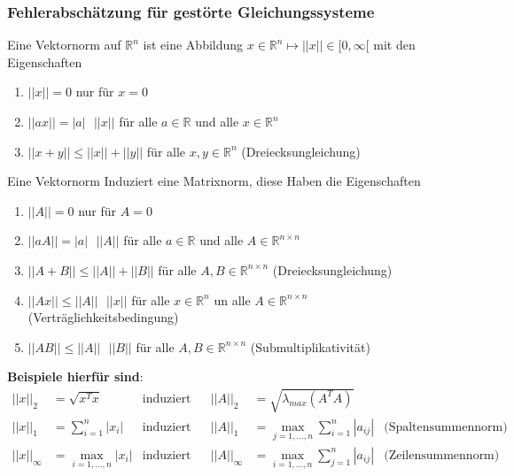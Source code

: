 \documentclass[
	ngerman,
	accentcolor=9c,%
	type=intern,
	marginpar=false
	]{tudapub}
\begin{document}
        \subsubsection{Fehlerabschätzung für gestörte Gleichungssysteme}
            \begin{definition}
                Eine Vektornorm auf $\mathbb{R}^n$ ist eine Abbildung $x \in \mathbb{R}^n \mapsto ||x|| \in [0,\infty[$ mit den Eigenschaften
                \begin{enumerate}[label=\alph*)]
                    \item $||x|| = 0$ nur für $x = 0$
                    \item $||ax|| = |a|\mbox{ }||x||$ für alle $a \in \mathbb{R}$ und alle $x \in \mathbb{R}^n$
                    \item $||x+y|| \leq ||x|| + ||y||$ für alle $x,y \in \mathbb{R}^n$ (Dreiecksungleichung) 
                \end{enumerate}
            \end{definition}\newpage
            \begin{definition}
                Eine Vektornorm Induziert eine Matrixnorm, diese Haben die Eigenschaften
                \begin{enumerate}[label=\alph*)]
                    \item $||A|| = 0$ nur für $A = 0$
                    \item $||aA|| = |a|\mbox{ }||A||$ für alle $a \in \mathbb{R}$ und alle $A \in \mathbb{R}^{n \times n}$
                    \item $||A+B|| \leq ||A|| + ||B||$ für alle $A,B \in \mathbb{R}^{n\times n}$ (Dreiecksungleichung) 
                    \item $||Ax|| \leq ||A|| \mbox{ } ||x||$ für alle $x \in \mathbb{R}^n$ un alle $A \in \mathbb{R}^{n \times n}$ (Verträglichkeitsbedingung)
                    \item $||AB|| \leq ||A|| \mbox{ }||B||$ für alle $A,B \in \mathbb{R}^{n\times n}$ (Submultiplikativität)
                \end{enumerate}
                \textbf{Beispiele hierfür sind}:
                \begin{align*}
                    ||x||_2 &= \sqrt{x^Tx} & \text{induziert} &&||A||_2 &= \sqrt{\lambda_{max}(A^TA)}\\
                    ||x||_1 &= \sum^n_{i=1}|x_i| & \text{induziert} && ||A||_1 &= \max_{j=1,\dots,n} \sum^n_{i=1} |a_{ij}| & \text{(Spaltensummennorm)}\\
                    ||x||_\infty &= \max_{i=1,\dots,n}|x_i| & \text{induziert} && ||A||_\infty &= \max_{i=1,\dots,n} \sum^n_{j=1} |a_{ij}| & \text{(Zeilensummennorm)}\\
                \end{align*}
            \end{definition}
\end{document}
